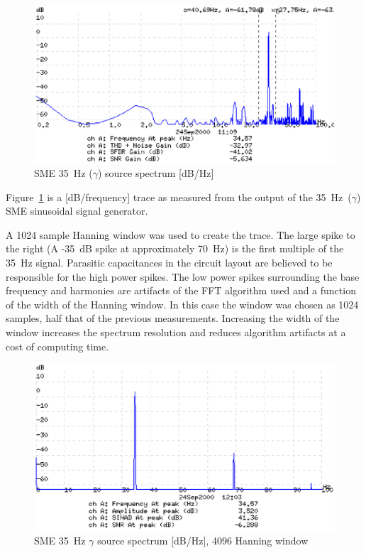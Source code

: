 \begin{figure}[htbp]
\begin{center}
	\includegraphics[width=\textwidth]{SME351.ps}
    \caption{SME 35~Hz ($\gamma$) source spectrum [dB/Hz]}
    \label{fig:sme35-1}
\end{center}
\end{figure}

Figure~\ref{fig:sme35-1} is a [dB/frequency] trace as measured from
the output of the 35~Hz~($\gamma$) SME sinusoidal signal generator.

A 1024 sample Hanning window was used to create the trace. The large
spike to the right (A -35~dB spike at approximately 70~Hz) is the
first multiple of the 35~Hz signal. Parasitic capacitances in the
circuit layout are believed to be responsible for the high power
spikes. The low power spikes surrounding the base frequency and
harmonies are artifacts of the FFT algorithm used and a function of
the width of the Hanning window. In this case the window was chosen as
1024 samples, half that of the previous measurements. Increasing the
width of the window increases the spectrum resolution and reduces
algorithm artifacts at a cost of computing time.


\begin{figure}[htbp]
\begin{center}
	\includegraphics[width=\textwidth]{SME353.ps}
    \caption{SME 35~Hz $\gamma$ source spectrum [dB/Hz], 4096 Hanning window}
    \label{fig:sme35-3}
\end{center}
\end{figure}


